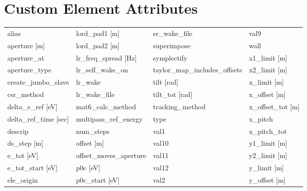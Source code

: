  \section{Custom Element Attributes}
 \label{s:list.custom}
 
 \begin{tabular}{llll} \toprule
alias                          & lord_pad1 [m]                  & sr_wake_file                   & val9                           \\
aperture [m]                   & lord_pad2 [m]                  & superimpose                    & wall                           \\
aperture_at                    & lr_freq_spread [Hz]            & symplectify                    & x1_limit [m]                   \\
aperture_type                  & lr_self_wake_on                & taylor_map_includes_offsets    & x2_limit [m]                   \\
create_jumbo_slave             & lr_wake                        & tilt [rad]                     & x_limit [m]                    \\
csr_method                     & lr_wake_file                   & tilt_tot [rad]                 & x_offset [m]                   \\
delta_e_ref [eV]               & mat6_calc_method               & tracking_method                & x_offset_tot [m]               \\
delta_ref_time [sec]           & multipass_ref_energy           & type                           & x_pitch                        \\
descrip                        & num_steps                      & val1                           & x_pitch_tot                    \\
ds_step [m]                    & offset [m]                     & val10                          & y1_limit [m]                   \\
e_tot [eV]                     & offset_moves_aperture          & val11                          & y2_limit [m]                   \\
e_tot_start [eV]               & p0c [eV]                       & val12                          & y_limit [m]                    \\
ele_origin                     & p0c_start [eV]                 & val2                           & y_offset [m]                   \\

\end{tabular}
